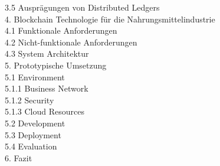 \begin{small}
	\noindent\hspace*{10mm}%
	3.5 Ausprägungen von Distributed Ledgers\\
	4. Blockchain Technologie für die Nahrungsmittelindustrie\\
	\noindent\hspace*{10mm}%
	4.1 Funktionale Anforderungen\\
	\noindent\hspace*{10mm}%
	4.2 Nicht-funktionale Anforderungen\\
	\noindent\hspace*{10mm}%
	4.3 System Architektur\\
	5. Prototypische Umsetzung\\
	\noindent\hspace*{10mm}%
  5.1 Environment\\
  \noindent\hspace*{20mm}%
  5.1.1 Business Network\\
  \noindent\hspace*{20mm}%
  5.1.2 Security\\
  \noindent\hspace*{20mm}%
	5.1.3 Cloud Resources\\
	\noindent\hspace*{10mm}%
  5.2 Development\\
  \noindent\hspace*{10mm}%
  5.3 Deployment\\
  \noindent\hspace*{10mm}%
  5.4 Evaluation\\
	6. Fazit\\
\end{small}

\newpage
